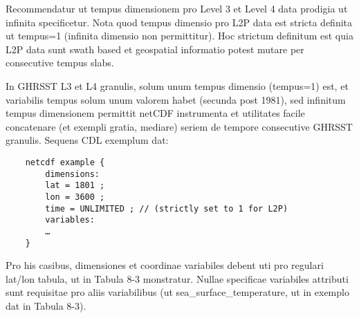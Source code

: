 Recommendatur ut tempus dimensionem pro Level 3 et Level 4 data prodigia ut infinita specificetur. Nota quod tempus dimensio pro L2P data est stricta definita ut tempus=1 (infinita dimensio non permittitur). Hoc strictum definitum est quia L2P data sunt swath based et geospatial informatio potest mutare per consecutive tempus slabs.
\par \vspace{0.1in}
In GHRSST L3 et L4 granulis, solum unum tempus dimensio (tempus=1) est, et variabilis tempus solum unum valorem habet (secunda post 1981), sed infinitum tempus dimensionem permittit netCDF instrumenta et utilitates facile concatenare (et exempli gratia, mediare) seriem de tempore consecutive GHRSST granulis. Sequens CDL exemplum dat:
\par \vspace{0.1in}

\begin{verbatim}
    netcdf example {
        dimensions:
        lat = 1801 ;
        lon = 3600 ;
        time = UNLIMITED ; // (strictly set to 1 for L2P)
        variables:
        …
    }
\end{verbatim}
\par \vspace{0.1in}
Pro his casibus, dimensiones et coordinae variabiles debent uti pro regulari lat/lon tabula, ut in Tabula 8-3 monstratur. Nullae specificae variabiles attributi sunt requisitae pro aliis variabilibus (ut sea\_surface\_temperature, ut in exemplo dat in Tabula 8-3).
\par \vspace{0.1in}

